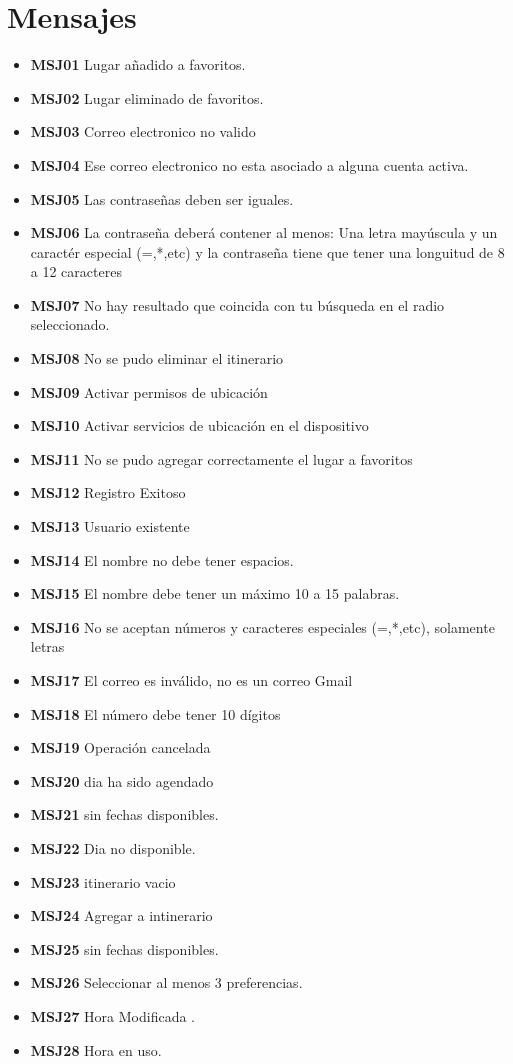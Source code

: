 \documentclass{article}
\begin{document}
\newpage
\section{Mensajes}
\begin{itemize}
    \item \textbf{MSJ01} Lugar añadido a favoritos.
    \item \textbf{MSJ02} Lugar eliminado de favoritos.
    \item \textbf{MSJ03} Correo electronico no valido
    \item \textbf{MSJ04} Ese correo electronico no esta asociado a alguna cuenta activa.
    \item \textbf{MSJ05} Las contraseñas deben ser iguales.
    \item \textbf{MSJ06} La contraseña deberá contener al menos: Una letra mayúscula y un caractér especial (=,*,etc) y la contraseña tiene que tener una longuitud de 8 a 12 caracteres
    \item \textbf{MSJ07} No hay resultado que coincida con tu búsqueda en el radio seleccionado.
    \item \textbf{MSJ08} No se pudo eliminar el itinerario


    \item \textbf{MSJ09} Activar permisos de ubicación


    \item \textbf{MSJ10} Activar servicios de ubicación en el dispositivo


    \item \textbf{MSJ11} No se pudo agregar correctamente el lugar a favoritos
    \item \textbf{MSJ12} Registro Exitoso
    \item \textbf{MSJ13} Usuario existente
    \item \textbf{MSJ14} El nombre no debe tener espacios.
    \item \textbf{MSJ15} El nombre debe tener un máximo 10 a 15 palabras.
    \item \textbf{MSJ16} No se aceptan números y caracteres especiales (=,*,etc), solamente letras
    \item \textbf{MSJ17} El correo es inválido, no es un correo Gmail
    \item \textbf{MSJ18} El número debe tener 10 dígitos
    \item \textbf{MSJ19} Operación cancelada
    \item \textbf{MSJ20} dia ha sido agendado
    \item \textbf{MSJ21} sin fechas disponibles.
    \item \textbf{MSJ22} Dia no disponible.
    \item \textbf{MSJ23} itinerario vacio
    \item \textbf{MSJ24} Agregar a intinerario
    \item \textbf{MSJ25} sin fechas disponibles.
    \item \textbf{MSJ26} Seleccionar al menos 3 preferencias.
    \item \textbf{MSJ27} Hora Modificada .
    \item \textbf{MSJ28} Hora en uso.
\end{itemize}
\end{document}
